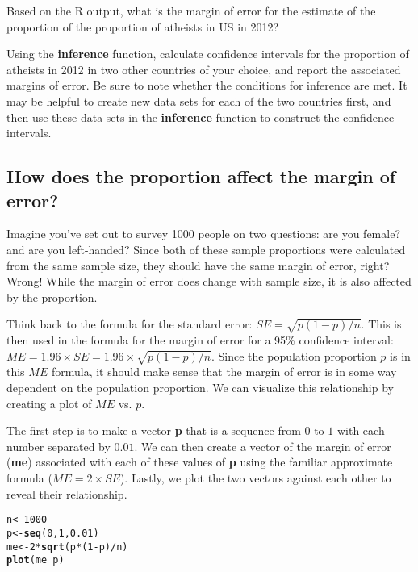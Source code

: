 \documentclass{article}\usepackage[]{graphicx}\usepackage[]{color}
\makeatletter
\newcommand{\hlnum}[1]{\textcolor[rgb]{0.686,0.059,0.569}{#1}}%
\newcommand{\hlopt}[1]{\textcolor[rgb]{0,0,0}{#1}}%
\newcommand{\hlstd}[1]{\textcolor[rgb]{0.345,0.345,0.345}{#1}}%
\newcommand{\hlkwb}[1]{\textcolor[rgb]{0.69,0.353,0.396}{#1}}%
\newcommand{\hlkwd}[1]{\textcolor[rgb]{0.737,0.353,0.396}{\textbf{#1}}}%
\newenvironment{kframe}{%
 \def\at@end@of@kframe{}%
 \ifinner\ifhmode%
  \def\at@end@of@kframe{\end{minipage}}%
  \begin{minipage}{\columnwidth}%
 \fi\fi%
 \def\FrameCommand##1{\hskip\@totalleftmargin \hskip-\fboxsep
 \colorbox{shadecolor}{##1}\hskip-\fboxsep
     \hskip-\linewidth \hskip-\@totalleftmargin \hskip\columnwidth}%
 \MakeFramed {\advance\hsize-\width
   \@totalleftmargin\z@ \linewidth\hsize
   \@setminipage}}%
 {\par\unskip\endMakeFramed%
 \at@end@of@kframe}
\newenvironment{knitrout}{}{} %
\makeatother
\begin{document}
\begin{exercise}
Based on the R output, what is the margin of error for the estimate of the proportion of the proportion of atheists in US in 2012? 
\end{exercise}

\begin{exercise}
Using the \hlkwd{inference} function, calculate confidence intervals for the proportion of atheists in 2012 in two other countries of your choice, and report the associated margins of error. Be sure to note whether the conditions for inference are met. It may be helpful to create new data sets for each of the two countries first, and then use these data sets in the \hlkwd{inference} function to construct the confidence intervals.
\end{exercise}

\subsection*{How does the proportion affect the margin of error?}
Imagine you've set out to survey 1000 people on two questions: are you female? and are you left-handed? Since both of these sample proportions were calculated from the same sample size, they should have the same margin of error, right? Wrong!  While the margin of error does change with sample size, it is also affected by the proportion.

Think back to the formula for the standard error: $SE = \sqrt{p(1-p)/n}$. This is then used in the formula for the margin of error for a 95\% confidence interval: $ME = 1.96\times SE = 1.96\times\sqrt{p(1-p)/n}$. Since the population proportion $p$ is in this $ME$ formula, it should make sense that the margin of error is in some way dependent on the population proportion. We can visualize this relationship by creating a plot of $ME$ vs. $p$.

The first step is to make a vector \hlkwd{p} that is a sequence from $0$ to $1$ with each number separated by $0.01$. We can then create a vector of the margin of error (\hlkwd{me}) associated with each of these values of \hlkwd{p} using the familiar approximate formula ($ME = 2 \times SE$). Lastly, we plot the two vectors against each other to reveal their relationship.

\begin{knitrout}
\color{fgcolor}\begin{kframe}
\begin{alltt}
\hlstd{n} \hlkwb{<-} \hlnum{1000}
\hlstd{p} \hlkwb{<-} \hlkwd{seq}\hlstd{(}\hlnum{0}\hlstd{,} \hlnum{1}\hlstd{,} \hlnum{0.01}\hlstd{)}
\hlstd{me} \hlkwb{<-} \hlnum{2} \hlopt{*} \hlkwd{sqrt}\hlstd{(p} \hlopt{*} \hlstd{(}\hlnum{1} \hlopt{-} \hlstd{p)}\hlopt{/}\hlstd{n)}
\hlkwd{plot}\hlstd{(me} \hlopt{~} \hlstd{p)}
\end{alltt}
\end{kframe}
\end{knitrout}
\end{document}
